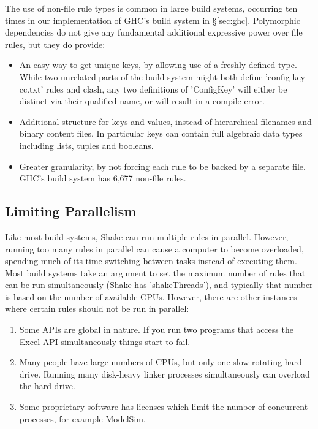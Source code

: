 The use of non-file rule types is common in large build systems, occurring ten times in our implementation of GHC's build system in \S\ref{sec:ghc}. Polymorphic dependencies do not give any fundamental additional expressive power over file rules, but they do provide:

\begin{itemize}
\item An easy way to get unique keys, by allowing use of a freshly defined type. While two unrelated parts of the build system might both define \lst'config-key-cc.txt' rules and clash, any two definitions of \lst'ConfigKey' will either be distinct via their qualified name, or will result in a compile error.
\item Additional structure for keys and values, instead of hierarchical filenames and binary content files. In particular keys can contain full algebraic data types including lists, tuples and booleans.
\item Greater granularity, by not forcing each rule to be backed by a separate file. GHC's build system has 6,677 non-file rules.
\end{itemize}
 
\subsection{Limiting Parallelism}

Like most build systems, Shake can run multiple rules in parallel. However, running too many rules in parallel can cause a computer to become overloaded, spending much of its time switching between tasks instead of executing them. Most build systems take an argument to set the maximum number of rules that can be run simultaneously (Shake has \lst'shakeThreads'), and typically that number is based on the number of available CPUs. However, there are other instances where certain rules should not be run in parallel:

\begin{enumerate}
\item Some APIs are global in nature. If you run two programs that access the Excel API simultaneously things start to fail.
\item Many people have large numbers of CPUs, but only one slow rotating hard-drive. Running many disk-heavy linker processes simultaneously can overload the hard-drive.
\item Some proprietary software has licenses which limit the number of concurrent processes, for example ModelSim.
\end{enumerate}

